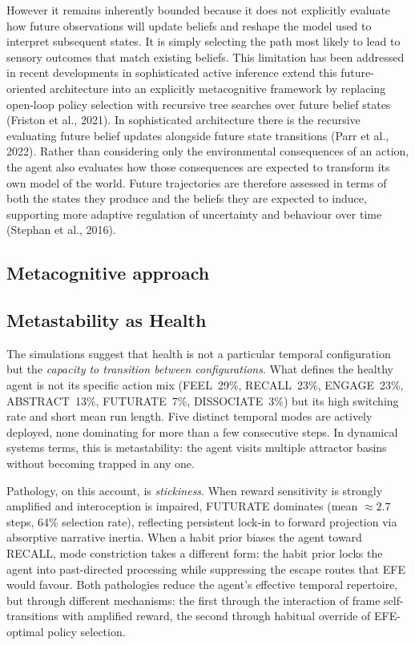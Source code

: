 \documentclass[11pt,a4paper]{article}
\newcommand{\rr}{\color{red!70!black}}
\begin{document}
{\rr
However it remains inherently bounded because it does not explicitly evaluate how future observations will update beliefs and reshape the model used to interpret subsequent states. It is simply selecting the path most likely to lead to sensory outcomes that match existing beliefs. This limitation has been addressed in recent developments in sophisticated active inference extend this future-oriented architecture into an explicitly metacognitive framework by replacing open-loop policy selection with recursive tree searches over future belief states (Friston et al., 2021). In sophisticated architecture there is the recursive evaluating future belief updates alongside future state transitions (Parr et al., 2022). Rather than considering only the environmental consequences of an action, the agent also evaluates how those consequences are expected to transform its own model of the world. Future trajectories are therefore assessed in terms of both the states they produce and the beliefs they are expected to induce, supporting more adaptive regulation of uncertainty and behaviour over time (Stephan et al., 2016).

}
\subsection{Metacognitive approach}

\subsection{Metastability as Health}\label{sec:metastability}

The simulations suggest that health is not a particular temporal configuration but the \emph{capacity to transition between configurations}. What defines the healthy agent is not its specific action mix (FEEL~29\%, RECALL~23\%, ENGAGE~23\%, ABSTRACT~13\%, FUTURATE~7\%, DISSOCIATE~3\%) but its high switching rate and short mean run length. Five distinct temporal modes are actively deployed, none dominating for more than a few consecutive steps. In dynamical systems terms, this is metastability: the agent visits multiple attractor basins without becoming trapped in any one.

Pathology, on this account, is \emph{stickiness}. When reward sensitivity is strongly amplified and interoception is impaired, FUTURATE dominates (mean $\approx 2.7$ steps, 64\% selection rate), reflecting persistent lock-in to forward projection via absorptive narrative inertia. When a habit prior biases the agent toward RECALL, mode constriction takes a different form: the habit prior locks the agent into past-directed processing while suppressing the escape routes that EFE would favour. Both pathologies reduce the agent's effective temporal repertoire, but through different mechanisms: the first through the interaction of frame self-transitions with amplified reward, the second through habitual override of EFE-optimal policy selection.
\end{document}
